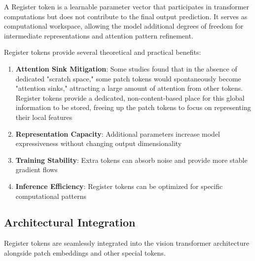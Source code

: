 \begin{definition}
A Register token is a learnable parameter vector that participates in transformer computations but does not contribute to the final output prediction. It serves as computational workspace, allowing the model additional degrees of freedom for intermediate representations and attention pattern refinement.
\end{definition}

Register tokens provide several theoretical and practical benefits:

\begin{enumerate}
\item \textbf{Attention Sink Mitigation}: Some studies found that in the absence of dedicated "scratch space," some patch tokens would spontaneously become "attention sinks," attracting a large amount of attention from other tokens. Register tokens provide a dedicated, non-content-based place for this global information to be stored, freeing up the patch tokens to focus on representing their local features
\item \textbf{Representation Capacity}: Additional parameters increase model expressiveness without changing output dimensionality
\item \textbf{Training Stability}: Extra tokens can absorb noise and provide more stable gradient flows
\item \textbf{Inference Efficiency}: Register tokens can be optimized for specific computational patterns
\end{enumerate}
\begin{comment}
It's worth explaining the first point a bit more. "Some studies found that in the absence of dedicated 'scratch space,' some patch tokens would spontaneously become 'attention sinks,' attracting a large amount of attention from other tokens. Register tokens provide a dedicated, non-content-based place for this global information to be stored, freeing up the patch tokens to focus on representing their local features."

STATUS: addressed - expanded explanation of attention sink mitigation with detailed description of the problem and solution
\end{comment}

\subsection{Architectural Integration}

Register tokens are seamlessly integrated into the vision transformer architecture alongside patch embeddings and other special tokens.

